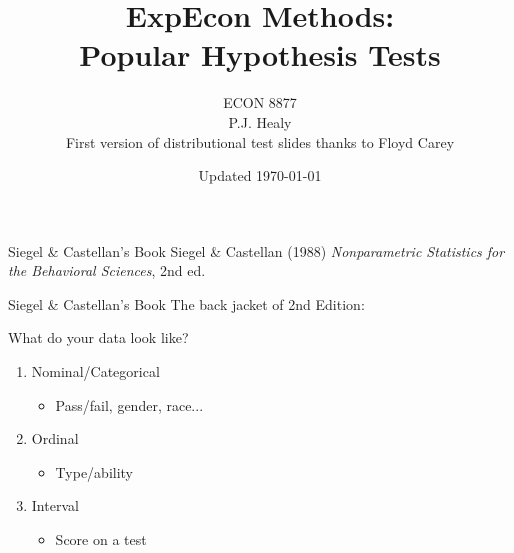 
\usepackage{copyrightbox}


\title[Popular Tests]{ExpEcon Methods:\\Popular Hypothesis Tests}
\author[ECON 8877]{ECON 8877\\P.J. Healy\\First version of distributional test slides thanks to Floyd Carey} \color{metrop}
\institute[OSU]{}
\date[]{\vfill {\tiny Updated \today}}



\frame{\maketitle}

    

\begin{frame}{Siegel \& Castellan's Book}
\vfill
Siegel \& Castellan (1988) \textit{Nonparametric Statistics for the Behavioral Sciences}, 2nd ed.
\vfill
\end{frame}

\begin{frame}{Siegel \& Castellan's Book}
The back jacket of 2nd Edition:
\br

What do your data look like?
\begin{enumerate}
    \item Nominal/Categorical
    \begin{itemize}
        \item Pass/fail, gender, race...
    \end{itemize}
    \item Ordinal
    \begin{itemize}
        \item Type/ability
    \end{itemize}
    \item Interval
    \begin{itemize}
        \item Score on a test
    \end{itemize}
\end{enumerate}
\end{frame}

